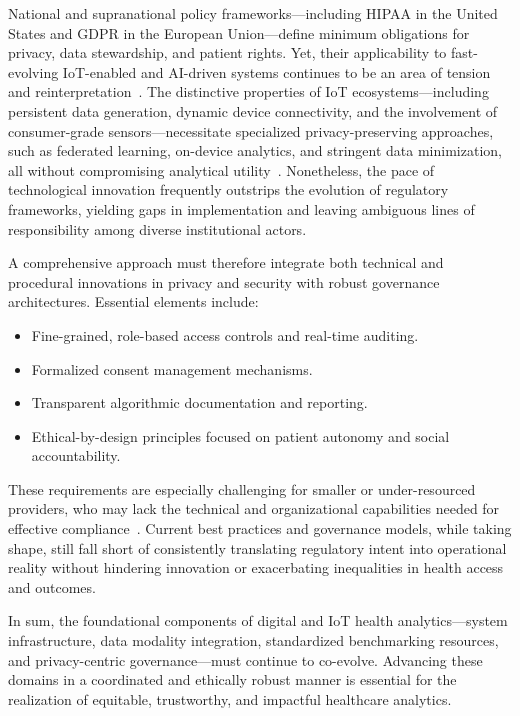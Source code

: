 \documentclass[sigconf]{acmart}
\begin{document}
National and supranational policy frameworks—including HIPAA in the United States and GDPR in the European Union—define minimum obligations for privacy, data stewardship, and patient rights. Yet, their applicability to fast-evolving IoT-enabled and AI-driven systems continues to be an area of tension and reinterpretation~\cite{ref2,ref4,ref5,ref6,ref7,ref8,ref9,ref10,ref24,ref25,ref28,ref30,ref31,ref33,ref34,ref35,ref36,ref41,ref43,ref46,ref50,ref54,ref51,ref61,ref62,ref63,ref64,ref65,ref70,ref71,ref72,ref75,ref76,ref77,ref78,ref79,ref82,ref83,ref84,ref90}. The distinctive properties of IoT ecosystems—including persistent data generation, dynamic device connectivity, and the involvement of consumer-grade sensors—necessitate specialized privacy-preserving approaches, such as federated learning, on-device analytics, and stringent data minimization, all without compromising analytical utility~\cite{ref83,ref84,ref90}. Nonetheless, the pace of technological innovation frequently outstrips the evolution of regulatory frameworks, yielding gaps in implementation and leaving ambiguous lines of responsibility among diverse institutional actors.

A comprehensive approach must therefore integrate both technical and procedural innovations in privacy and security with robust governance architectures. Essential elements include:

\begin{itemize}
    \item Fine-grained, role-based access controls and real-time auditing.
    \item Formalized consent management mechanisms.
    \item Transparent algorithmic documentation and reporting.
    \item Ethical-by-design principles focused on patient autonomy and social accountability.
\end{itemize}

These requirements are especially challenging for smaller or under-resourced providers, who may lack the technical and organizational capabilities needed for effective compliance~\cite{ref82,ref84,ref106}. Current best practices and governance models, while taking shape, still fall short of consistently translating regulatory intent into operational reality without hindering innovation or exacerbating inequalities in health access and outcomes.

In sum, the foundational components of digital and IoT health analytics—system infrastructure, data modality integration, standardized benchmarking resources, and privacy-centric governance—must continue to co-evolve. Advancing these domains in a coordinated and ethically robust manner is essential for the realization of equitable, trustworthy, and impactful healthcare analytics.
\end{document}
